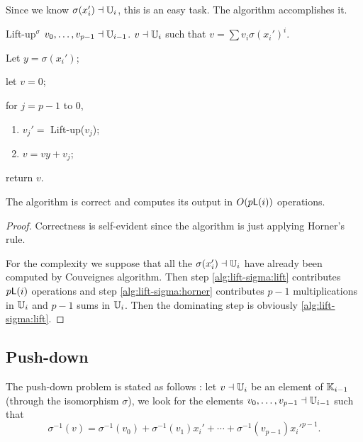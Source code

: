 Since we know $\sigma(x_i')\dashv\mathbb{U}_i$, this is an easy task. The
algorithm  accomplishes it.

\begin{algorithm}
  {Lift-up$^\sigma$}
  {$v_0,\ldots,v_{p-1}\dashv\mathbb{U}_{i-1}$.}
  {$v\dashv\mathbb{U}_i$ such that $v = \sum v_i\sigma(x_i')^i$.}
\item Let $y = \sigma(x_i')$;
\item let $v = 0$;
\item for $j = p-1$ to $0$,
  \begin{enumerate}
  \item \label{alg:lift-sigma:lift}$v_j' = $ Lift-up($v_j$);
  \item \label{alg:lift-sigma:horner}$v = vy + v_j$;
  \end{enumerate}
\item return $v$.
\end{algorithm}

\begin{theorem}
  The algorithm  is correct and computes its
  output in $O(p\mathrm{\sf L}(i))$ operations.
\end{theorem}
\begin{proof}
  Correctness is self-evident since the algorithm is just applying
  Horner's rule.

  For the complexity we suppose that all the $\sigma(x_i')\dashv\mathbb{U}_i$
  have already been computed by Couveignes algorithm. Then step
  \ref{alg:lift-sigma:lift} contributes $p\mathrm{\sf L}(i)$ operations and
  step \ref{alg:lift-sigma:horner} contributes $p-1$ multiplications
  in $\mathbb{U}_i$ and $p-1$ sums in $\mathbb{U}_i$. Then the dominating step is
  obviously \ref{alg:lift-sigma:lift}.
\end{proof}


\subsection{Push-down}
\label{sec:isomorphism:push-down}
The push-down problem is stated as follows : let $v\dashv\mathbb{U}_i$ be an
element of $\mathbb{K}_{i-1}$ (through the isomorphism $\sigma$), we look for
the elements $v_0,\ldots,v_{p-1}\dashv\mathbb{U}_{i-1}$ such that
\begin{equation*}
  \sigma^{-1}(v) =
  \sigma^{-1}(v_0) + \sigma^{-1}(v_1)x_i' +
  \cdots + \sigma^{-1}(v_{p-1})x_i'^{p-1}
  \text{.}
\end{equation*}

